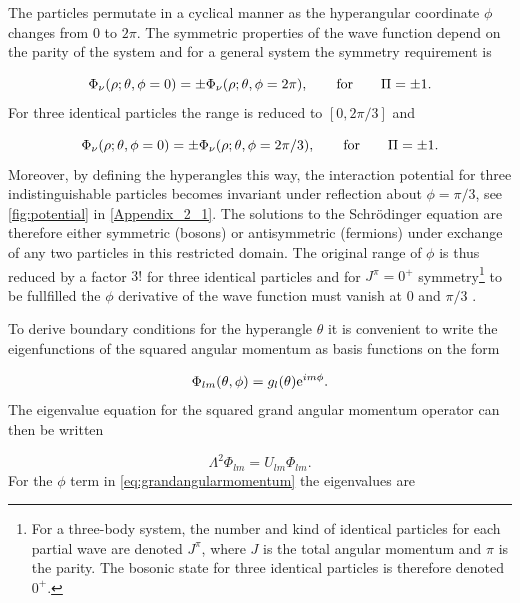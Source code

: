 The particles permutate in a cyclical manner as the hyperangular coordinate $\phi$ changes from $0$ to $2\pi$. The symmetric properties of the wave function depend on the parity of the system and for a general system the symmetry requirement is \cite{SunoEsryGreeneBurke2002}

\begin{equation}
\Phi_{\nu}(\rho;\theta,\phi = 0) = \pm \Phi_{\nu}(\rho;\theta,\phi = 2\pi), \qquad \text{for} \qquad \Pi = \pm 1.\\
\end{equation}
For three identical particles the range is reduced to $[0,2\pi/3]$ and 

\begin{equation}
\Phi_{\nu}(\rho;\theta,\phi = 0) = \pm \Phi_{\nu}(\rho;\theta,\phi = 2\pi/3), \qquad \text{for} \qquad \Pi = \pm 1.\\
\end{equation}
Moreover, by defining the hyperangles this way, the interaction potential for three indistinguishable particles becomes invariant under reflection about $\phi=\pi/3$, see \cref{fig:potential} in \cref{Appendix_2_1}. The solutions to the Schr{\"o}dinger equation are therefore either symmetric (bosons) or antisymmetric (fermions) under exchange of any two particles in this restricted domain. The original range of $\phi$ is thus reduced by a factor $3!$ for three identical particles and for $J^{\pi} = 0^+$  symmetry\footnote{For a three-body system, the number and kind of identical particles for each partial wave are denoted $J^{\pi}$, where $J$ is the total angular momentum and $\pi$ is the parity. The bosonic state for three identical particles is therefore denoted $0^+$.} to be fullfilled the $\phi$ derivative of the wave function must vanish at $0$ and $\pi/3$ \cite{EsryGreeneSuno2001}.

To derive boundary conditions for the hyperangle $\theta$ it is convenient to write the eigenfunctions of the squared angular momentum as basis functions on the form

\begin{equation}\label{eq:newbase}
\Phi_{l m}(\theta,\phi) = g_{l}(\theta) \mathrm{e}^{ i m \phi}. 
\end{equation}
The eigenvalue equation for the squared grand angular momentum operator can then be written

\begin{equation}\label{eq:eigenlambda}
\Lambda^2 \Phi_{l m} = U_{lm}\Phi_{l m}.
\end{equation} 
For the $\phi$ term in \eqref{eq:grandangularmomentum} the eigenvalues are 

